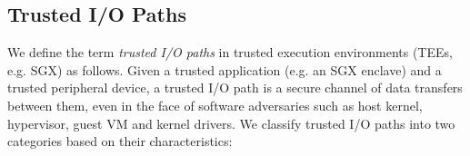 \subsection{Trusted I/O Paths}\label{types}
We define the term \emph{trusted I/O paths} in trusted execution environments (TEEs, e.g. SGX) as follows. Given a trusted application (e.g. an SGX enclave) and a trusted peripheral device, a trusted I/O path is a secure channel of data transfers between them, even in the face of software adversaries such as host kernel, hypervisor, guest VM and kernel drivers. We classify trusted I/O paths into two categories based on their characteristics: %

